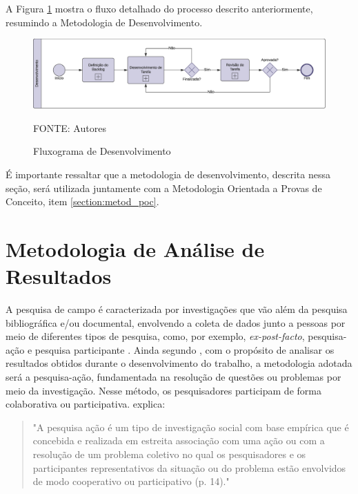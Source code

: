 A Figura \ref{flux_dev} mostra o fluxo detalhado do processo descrito anteriormente, resumindo 
a Metodologia de Desenvolvimento.

\begin{figure}[h]
	\centering
    \caption{Fluxograma de Desenvolvimento}
	\includegraphics[keepaspectratio=true,scale=0.4]{figuras/fluxo_desenvolvimento.eps}
	\parbox{\linewidth}{\centering FONTE: Autores}
	\label{flux_dev}
\end{figure}

É importante ressaltar que a metodologia de desenvolvimento, descrita nessa seção, será utilizada juntamente 
com a Metodologia Orientada a Provas de Conceito, item \ref{section:metod_poc}.

\section{Metodologia de Análise de Resultados}
\label{section:metodologia_analise_resultados}

A pesquisa de campo é caracterizada por investigações que vão além da pesquisa bibliográfica e/ou documental, 
envolvendo a coleta de dados junto a pessoas por meio de diferentes tipos de pesquisa, como, por exemplo, \textit{ex-post-facto}, 
pesquisa-ação e pesquisa participante \cite{gerhardt2009metodos}. Ainda segundo \cite{gerhardt2009metodos}, com o propósito 
de analisar os resultados obtidos durante o desenvolvimento do trabalho, a metodologia adotada será a pesquisa-ação, 
fundamentada na resolução de questões ou problemas por meio da investigação. Nesse método, os pesquisadores participam de 
forma colaborativa ou participativa. \cite{thiollent1988metodologia} explica:

\begin{quotation}
\begin{adjustwidth}{4cm}{-1cm}
"A pesquisa ação é um tipo de investigação social com base empírica que é concebida e realizada em estreita 
associação com uma ação ou com a resolução de um problema coletivo no qual os pesquisadores e os participantes representativos 
da situação ou do problema estão envolvidos de modo cooperativo ou participativo (p. 14)."
\end{adjustwidth}
\end{quotation}

